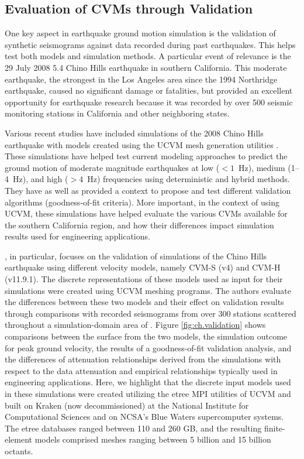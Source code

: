 
\subsection{Evaluation of CVMs through Validation}

One key aspect in earthquake ground motion simulation is the validation of synthetic seismograms against data recorded during past earthquakes. This helps test both models and simulation methods. A particular event of relevance is the 29 July 2008  5.4 Chino Hills earthquake in southern California. This moderate earthquake, the strongest in the Los Angeles area since the 1994 Northridge earthquake, caused no significant damage or fatalities, but provided an excellent opportunity for earthquake research because it was recorded by over 500 seismic monitoring stations in California and other neighboring states. 

Various recent studies have included simulations of the 2008 Chino Hills earthquake with models created using the UCVM mesh generation utilities \citep[e.g.,][]{Olsen_2010_SRL, Taborda_2013_BSSA, Taborda_2014_BSSA}. These simulations have helped test current modeling approaches to predict the ground motion of moderate magnitude earthquakes at low ($<1$~Hz), medium (1--4~Hz), and high ($>4$~Hz) frequencies using deterministic and hybrid methods. They have as well as provided a context to propose and test different validation algorithms (goodness-of-fit criteria). More important, in the context of using UCVM, these simulations have helped evaluate the various CVMs available for the southern California region, and how their differences impact simulation results used for engineering applications.

\citet{Taborda_2014_BSSA}, in particular, focuses on the validation of simulations of the Chino Hills earthquake using different velocity models, namely CVM-S (v4) and CVM-H (v11.9.1). The discrete representations of these models used as input for their simulations were created using UCVM meshing programs. The authors evaluate the differences between these two models and their effect on validation results through comparisons with recorded seismograms from over 300 stations scattered throughout a simulation-domain area of . Figure \ref{fig:ch.validation} shows comparisons between the surface \vs{} from the two models, the simulation outcome for peak ground velocity, the results of a goodness-of-fit validation analysis, and the differences of attenuation relationships derived from the simulations with respect to the data attenuation and empirical relationships typically used in engineering applications. Here, we highlight that the discrete input models used in these simulations were created utilizing the etree MPI utilities of UCVM and built on Kraken (now decommissioned) at the National Institute for Computational Sciences and on NCSA's Blue Waters supercomputer systems. The etree databases ranged between 110 and 260 GB, and the resulting finite-element models comprised meshes ranging between 5 billion and 15 billion octants.

